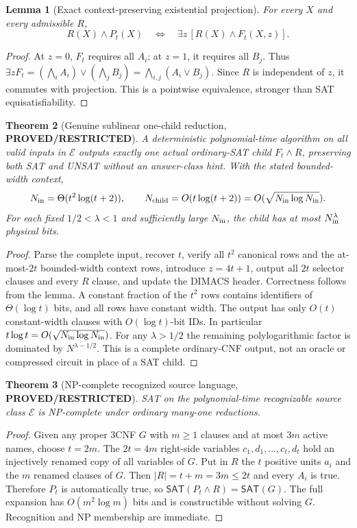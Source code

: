 \documentclass[11pt]{article}
\newtheorem{theorem}{Theorem}
\newtheorem{lemma}[theorem]{Lemma}
\newcommand{\SAT}{\mathsf{SAT}}
\begin{document}
\begin{lemma}[Exact context-preserving existential projection]
For every $X$ and every admissible $R$,
\[
 R(X)\wedge P_t(X)\quad\Longleftrightarrow\quad
               \exists z\,[R(X)\wedge F_t(X,z)].
\]
\end{lemma}
\begin{proof}
At $z=0$, $F_t$ requires all $A_i$; at $z=1$, it
requires all $B_j$. Thus $\exists z F_t=(\bigwedge_i A_i)
\vee(\bigwedge_j B_j)=\bigwedge_{i,j}(A_i\vee B_j)$.
Since $R$ is independent of $z$, it commutes with projection.
This is a pointwise equivalence, stronger than SAT equisatisfiability.
\end{proof}

\begin{theorem}[Genuine sublinear one-child reduction,
\textbf{PROVED/RESTRICTED}]
A deterministic polynomial-time algorithm on all valid inputs in
$\mathcal E$ outputs exactly one actual ordinary-SAT child
$F_t\wedge R$, preserving both SAT and UNSAT without an answer-class
hint. With the stated bounded-width context,
\[
 N_{\rm in}=\Theta(t^2\log(t+2)),\qquad
 N_{\rm child}=O(t\log(t+2))
             =O(\sqrt{N_{\rm in}\log N_{\rm in}}).
\]
For each fixed $1/2<\lambda<1$ and sufficiently large $N_{\rm in}$,
the child has at most $N_{\rm in}^{\lambda}$ physical bits.
\end{theorem}
\begin{proof}
Parse the complete input, recover $t$, verify all $t^2$ canonical rows
and the at-most-$2t$ bounded-width context rows, introduce
$z=4t+1$, output all $2t$ selector clauses and every $R$ clause,
and update the DIMACS header. Correctness follows from the lemma.
A constant fraction of the $t^2$ rows contains identifiers of
$\Theta(\log t)$ bits, and all rows have constant width.
The output has only $O(t)$ constant-width clauses with $O(\log t)$-bit
IDs. In particular
$t\log t=O(\sqrt{N_{\rm in}\log N_{\rm in}})$.
For any $\lambda>1/2$ the remaining polylogarithmic factor
is dominated by $N^{\lambda-1/2}$.
This is a complete ordinary-CNF output, not an oracle or compressed
circuit in place of a SAT child.
\end{proof}

\begin{theorem}[NP-complete recognized source language,
\textbf{PROVED/RESTRICTED}]
SAT on the polynomial-time recognizable source class $\mathcal E$
is NP-complete under ordinary many-one reductions.
\end{theorem}
\begin{proof}
Given any proper 3CNF $G$ with $m\ge1$ clauses and at most $3m$
active names, choose $t=2m$. The $2t=4m$ right-side variables
$c_1,d_1,\ldots,c_t,d_t$ hold an injectively renamed copy of all
variables of $G$. Put in $R$ the $t$ positive units $a_i$ and
the $m$ renamed clauses of $G$. Then
$|R|=t+m=3m\le 2t$ and every $A_i$ is true.
Therefore $P_t$ is automatically true, so
$\SAT(P_t\wedge R)=\SAT(G)$. The full expansion has
$O(m^2\log m)$ bits and is constructible without solving $G$.
Recognition and NP membership are immediate.
\end{proof}
\end{document}
